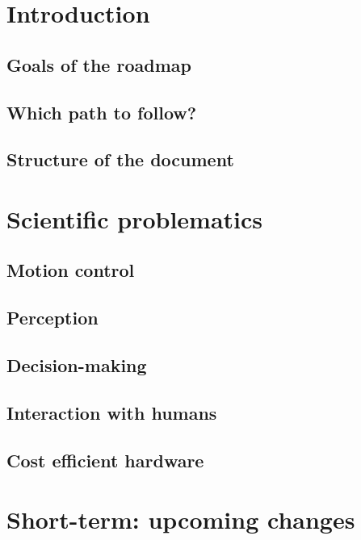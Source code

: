 \documentclass{article}
\begin{document}
\section{Introduction}



\subsection{Goals of the roadmap}

\subsection{Which path to follow?}

\subsection{Structure of the document}

\section{Scientific problematics}

\subsection{Motion control}

\subsection{Perception}

\subsection{Decision-making}

\subsection{Interaction with humans}

\subsection{Cost efficient hardware}

\section{Short-term: upcoming changes}
\end{document}
